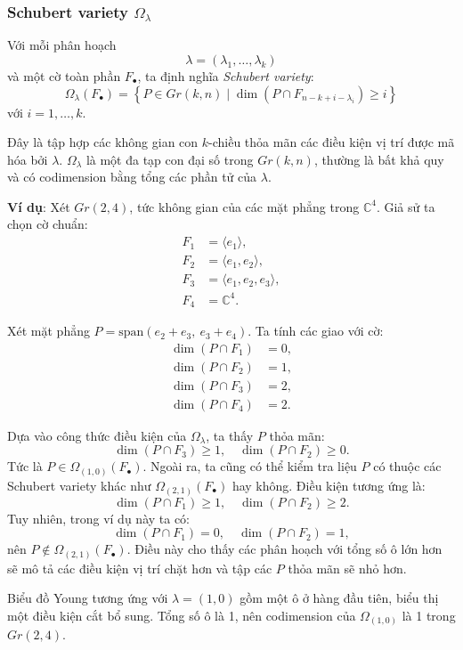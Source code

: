 \subsubsection{\textbf{Schubert variety $\Omega_\lambda$}}
Với mỗi phân hoạch 
$$\lambda = (\lambda_1, \dots, \lambda_k)$$
và một cờ toàn phần $F_\bullet$, ta định nghĩa \textit{Schubert variety}:
$$
\Omega_\lambda(F_\bullet) = \left\{ P \in Gr(k,n) \mid \dim(P \cap F_{n-k+i - \lambda_i}) \geq i\right\}
$$
với $i = 1, \dots, k$.

Đây là tập hợp các không gian con $k$-chiều thỏa mãn các điều kiện vị trí được mã hóa bởi $\lambda$. $\Omega_\lambda$ là một đa tạp con đại số trong $Gr(k,n)$, thường là bất khả quy và có codimension bằng tổng các phần tử của $\lambda$.

\textbf{Ví dụ}: Xét $Gr(2,4)$, tức không gian của các mặt phẳng trong $\mathbb{C}^4$. Giả sử ta chọn cờ chuẩn:
\begin{align*}
F_1 &= \langle e_1 \rangle, \\
F_2 &= \langle e_1, e_2 \rangle, \\
F_3 &= \langle e_1, e_2, e_3 \rangle, \\
F_4 &= \mathbb{C}^4.
\end{align*}

Xét mặt phẳng $P = \text{span}(e_2 + e_3,\ e_3 + e_4)$. Ta tính các giao với cờ:
\begin{align*}
\dim(P \cap F_1) &= 0, \\
\dim(P \cap F_2) &= 1, \\
\dim(P \cap F_3) &= 2, \\
\dim(P \cap F_4) &= 2.
\end{align*}

Dựa vào công thức điều kiện của $\Omega_\lambda$, ta thấy $P$ thỏa mãn:
\[ \dim(P \cap F_3) \geq 1, \quad \dim(P \cap F_2) \geq 0. \]
Tức là $P \in \Omega_{(1,0)}(F_\bullet)$. Ngoài ra, ta cũng có thể kiểm tra liệu $P$ có thuộc các Schubert variety khác như $\Omega_{(2,1)}(F_\bullet)$ hay không. Điều kiện tương ứng là:
\[ \dim(P \cap F_1) \geq 1, \quad \dim(P \cap F_2) \geq 2. \]
Tuy nhiên, trong ví dụ này ta có:
\[ \dim(P \cap F_1) = 0, \quad \dim(P \cap F_2) = 1, \]
nên $P \notin \Omega_{(2,1)}(F_\bullet)$. Điều này cho thấy các phân hoạch với tổng số ô lớn hơn sẽ mô tả các điều kiện vị trí chặt hơn và tập các $P$ thỏa mãn sẽ nhỏ hơn.


Biểu đồ Young tương ứng với $\lambda = (1,0)$ gồm một ô ở hàng đầu tiên, biểu thị một điều kiện cắt bổ sung. Tổng số ô là 1, nên codimension của $\Omega_{(1,0)}$ là 1 trong $Gr(2,4)$.

